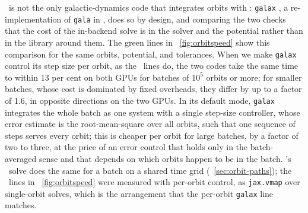 \galpy\ is not the only galactic-dynamics code that integrates orbits
with \diffrax: \texttt{galax} \citep{Starkman2026}, a re-implementation
of \texttt{gala} in \jax, does so by design, and comparing the two
checks that the cost of the in-backend solve is in the solver and the
potential rather than in the library around them. The green lines in
\figurename~\ref{fig:orbitspeed} show this comparison for the same
orbits, potential, and tolerances. When we make \texttt{galax} control
its step size per orbit, as the \galpy\ lines do, the two codes take the same
time to within 13 per cent on both GPUs for batches of $10^5$ orbits or
more; for smaller batches, whose cost is dominated by fixed overheads,
they differ by up to a factor of 1.6, in opposite directions on the two
GPUs. In its default mode, \texttt{galax} integrates the whole batch as
one system with a single step-size controller, whose error estimate is
the root-mean-square over all orbits, such that one sequence of steps
serves every orbit; this is cheaper per orbit for large batches, by a
factor of two to three, at the price of an error control that holds
only in the batch-averaged sense and that depends on which orbits
happen to be in the batch. \galpy's \jax\ solve does the same for a
batch on a shared time grid (\sectionname~\ref{sec:orbit-paths}); the
\galpy\ lines in \figurename~\ref{fig:orbitspeed} were measured with
per-orbit control, as \texttt{jax.vmap} over single-orbit solves, which
is the arrangement that the per-orbit \texttt{galax} line matches.

